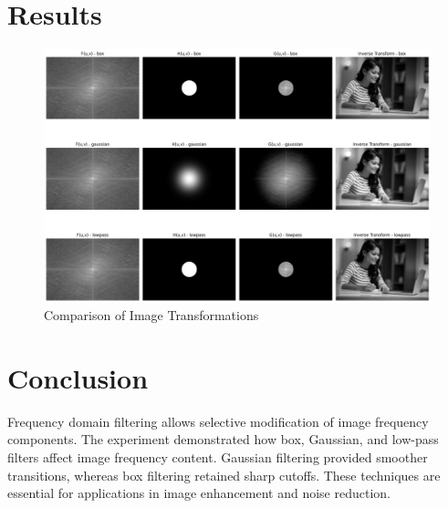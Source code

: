 \documentclass{report}
\begin{document}
\section{Results}

\begin{figure}[h]
    \includegraphics[width=\textwidth]{images/Exp-7-Results-1.png}
    \caption{Comparison of Image Transformations}
    \label{fig:noisy}
\end{figure}

\section{Conclusion}
Frequency domain filtering allows selective modification of image frequency components. The experiment demonstrated how box, Gaussian, and low-pass filters affect image frequency content. Gaussian filtering provided smoother transitions, whereas box filtering retained sharp cutoffs. These techniques are essential for applications in image enhancement and noise reduction.
\end{document}
